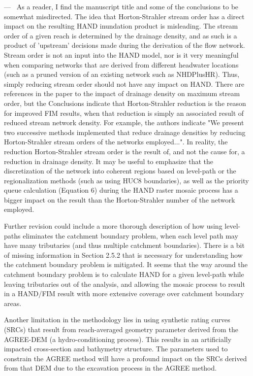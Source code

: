 \documentclass[11pt]{article}
\newcounter{reviewer}
\newcounter{point}[reviewer]
\renewcommand{\thepoint}{P\,\thereviewer.\arabic{point}}
\newenvironment{point}
   {\refstepcounter{point} \bigskip \noindent {\textbf{Reviewer~Point~\thepoint} } ---\ }
   {\par }
\begin{document}
\begin{point}
As a reader, I find the manuscript title and some of the conclusions to be somewhat misdirected.
The idea that Horton-Strahler stream order has a direct impact on the resulting HAND inundation product is misleading.
The stream order of a given reach is determined by the drainage density, and as such is a product of 'upstream' decisions made during the derivation of the flow network.
Stream order is not an input into the HAND model, nor is it very meaningful when comparing networks that are derived from different headwater locations (such as a pruned version of an existing network such as NHDPlusHR).
Thus, simply reducing stream order should not have any impact on HAND.
There are references in the paper to the impact of drainage density on maximum stream order, but the Conclusions indicate that Horton-Strahler reduction is the reason for improved FIM results, when that reduction is simply an associated result of reduced stream network density.
For example, the authors indicate "We present two successive methods implemented that reduce drainage densities by reducing Horton-Strahler stream orders of the networks employed...".
In reality, the reduction Horton-Strahler stream order is the result of, and not the cause for, a reduction in drainage density.
It may be useful to emphasize that the discretization of the network into coherent regions based on level-path or the regionalization methods (such as using HUC8 boundaries), as well as the priority queue calculation (Equation 6) during the HAND raster mosaic process has a bigger impact on the result than the Horton-Strahler number of the network employed.

Further revision could include a more thorough description of how using level-paths eliminates the catchment boundary problem, when each level path may have many tributaries (and thus multiple catchment boundaries).
There is a bit of missing information in Section 2.5.2 that is necessary for understanding how the catchment boundary problem is mitigated.
It seems that the way around the catchment boundary problem is to calculate HAND for a given level-path while leaving tributaries out of the analysis, and allowing the mosaic process to result in a HAND/FIM result with more extensive coverage over catchment boundary areas.

Another limitation in the methodology lies in using synthetic rating curves (SRCs) that result from reach-averaged geometry parameter derived from the AGREE-DEM (a hydro-conditioning process).
This results in an artificially impacted cross-section and bathymetry structure.
The parameters used to constrain the AGREE method will have a profound impact on the SRCs derived from that DEM due to the excavation process in the AGREE method.


\end{point}
\end{document}
